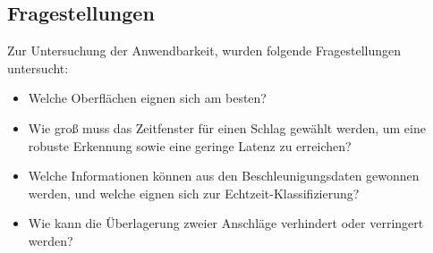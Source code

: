 \subsection{Fragestellungen}
Zur Untersuchung der Anwendbarkeit, wurden folgende Fragestellungen untersucht:
\begin{itemize}
	\item Welche Oberflächen eignen sich am besten?
	\item Wie groß muss das Zeitfenster für einen Schlag gewählt werden, um eine robuste Erkennung sowie eine geringe Latenz zu erreichen?
	\item Welche Informationen können aus den Beschleunigungsdaten gewonnen werden, und welche eignen sich zur Echtzeit-Klassifizierung?
	\item Wie kann die Überlagerung zweier Anschläge verhindert oder verringert werden?
\end{itemize}